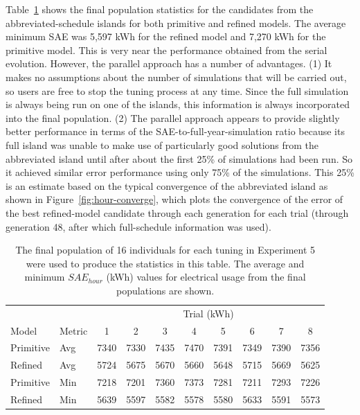 \documentclass[preprint, review, 12pt]{elsarticle}
\begin{document}
Table~\ref{tab:hourly-parallel} shows the final population statistics for the candidates from the abbreviated-schedule islands for both primitive and refined models. The average minimum SAE was 5,597 kWh for the refined model and 7,270 kWh for the primitive model. This is very near the performance obtained from the serial evolution. However, the parallel approach has a number of advantages. (1) It makes no assumptions about the number of simulations that will be carried out, so users are free to stop the tuning process at any time. Since the full simulation is always being run on one of the islands, this information is always incorporated into the final population. (2) The parallel approach appears to provide slightly better performance in terms of the SAE-to-full-year-simulation ratio because its full island was unable to make use of particularly good solutions from the abbreviated island until after about the first 25\% of simulations had been run. So it achieved similar error performance using only 75\% of the simulations. This 25\% is an estimate based on the typical convergence of the abbreviated island as shown in Figure~\ref{fig:hour-converge}, which plots the convergence of the error of the best refined-model candidate through each generation for each trial (through generation 48, after which full-schedule information was used).

\begin{table}[htbp]
\centering
\caption{The final population of 16 individuals for each tuning in Experiment 5 were used to produce the statistics in this table. The average and minimum $SAE_{hour}$ (kWh) values for electrical usage from the final populations are shown.}
\label{tab:hourly-parallel}
\begin{tabular}{llcccccccc}
\toprule
 &  & \multicolumn{8}{c}{Trial (kWh)}\\
Model & Metric & 1 & 2 & 3 & 4 & 5 & 6 & 7 & 8\\
\midrule
Primitive & Avg & 7340 & 7330 & 7435 & 7470 & 7391 & 7349 & 7390 & 7356\\\rowcolor{DarkRow}
Refined   & Avg & 5724 & 5675 & 5670 & 5660 & 5648 & 5715 & 5669 & 5625\\
Primitive & Min & 7218 & 7201 & 7360 & 7373 & 7281 & 7211 & 7293 & 7226\\\rowcolor{DarkRow}
Refined   & Min & 5639 & 5597 & 5582 & 5578 & 5580 & 5633 & 5591 & 5573\\
\bottomrule
\end{tabular}
\end{table}
\end{document}
